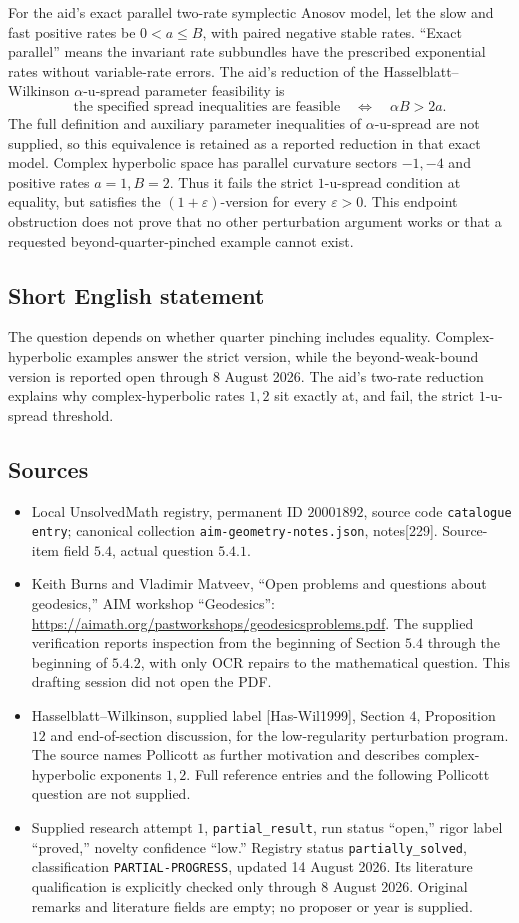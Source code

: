 \documentclass[11pt]{article}
\newcommand{\eps}{\varepsilon}
\begin{document}
For the aid's exact parallel two-rate symplectic Anosov model, let the slow and fast positive rates be \(0<a\leq B\), with paired negative stable rates. ``Exact parallel'' means the invariant rate subbundles have the prescribed exponential rates without variable-rate errors. The aid's reduction of the Hasselblatt--Wilkinson \(\alpha\)-u-spread parameter feasibility is
\[
 \text{the specified spread inequalities are feasible}
       \quad\Longleftrightarrow\quad \alpha B>2a.
\]
The full definition and auxiliary parameter inequalities of \(\alpha\)-u-spread are not supplied, so this equivalence is retained as a reported reduction in that exact model. Complex hyperbolic space has parallel curvature sectors \(-1,-4\) and positive rates \(a=1,B=2\). Thus it fails the strict \(1\)-u-spread condition at equality, but satisfies the \((1+\eps)\)-version for every \(\eps>0\). This endpoint obstruction does not prove that no other perturbation argument works or that a requested beyond-quarter-pinched example cannot exist.
\subsection{Short English statement}
The question depends on whether quarter pinching includes equality. Complex-hyperbolic examples answer the strict version, while the beyond-weak-bound version is reported open through 8 August 2026. The aid's two-rate reduction explains why complex-hyperbolic rates \(1,2\) sit exactly at, and fail, the strict \(1\)-u-spread threshold.
\subsection{Sources}
\begin{itemize}
\item Local UnsolvedMath registry, permanent ID \(20001892\), source code \texttt{catalogue entry}; canonical collection \texttt{aim-geometry-notes.json}, notes[229]. Source-item field \(5.4\), actual question \(5.4.1\).
\item Keith Burns and Vladimir Matveev, ``Open problems and questions about geodesics,'' AIM workshop ``Geodesics'': \url{https://aimath.org/pastworkshops/geodesicsproblems.pdf}. The supplied verification reports inspection from the beginning of Section \(5.4\) through the beginning of \(5.4.2\), with only OCR repairs to the mathematical question. This drafting session did not open the PDF.
\item Hasselblatt--Wilkinson, supplied label [Has-Wil1999], Section \(4\), Proposition \(12\) and end-of-section discussion, for the low-regularity perturbation program. The source names Pollicott as further motivation and describes complex-hyperbolic exponents \(1,2\). Full reference entries and the following Pollicott question are not supplied.
\item Supplied research attempt \(1\), \texttt{partial\_result}, run status ``open,'' rigor label ``proved,'' novelty confidence ``low.'' Registry status \texttt{partially\_solved}, classification \texttt{PARTIAL-PROGRESS}, updated 14 August 2026. Its literature qualification is explicitly checked only through 8 August 2026. Original remarks and literature fields are empty; no proposer or year is supplied.
\end{itemize}
\end{document}
